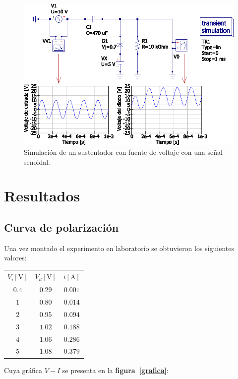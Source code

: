 \documentclass[letter,twoside,11pt]{article}
\begin{document}
\begin{figure}[!h]
\centering
\includegraphics[scale=0.97]{simulacion/practica1.13.eps}
\caption{Simulación de un sustentador con fuente de voltaje con una señal
senoidal.}
\label{simulacion13}
\end{figure}

\newpage
\section{Resultados}

\subsection{Curva de polarización}
Una vez montado el experimento en laboratorio se obtuvieron los siguientes
valores:

\begin{center}
    \begin{tabular}{|c|c|c|}
    \hline
    $V_i[\text{V}]$ & $V_d[\text{V}]$ & $i[\text{A}]$
    \tabularnewline \hline \hline
    $0.4$ & $0.29$ & $0.001$ \tabularnewline \hline
    $1$   & $0.80$ & $0.014$ \tabularnewline \hline
    $2$   & $0.95$ & $0.094$ \tabularnewline \hline
    $3$   & $1.02$ & $0.188$ \tabularnewline \hline
    $4$   & $1.06$ & $0.286$ \tabularnewline \hline
    $5$   & $1.08$ & $0.379$ \tabularnewline \hline
    \end{tabular}
\end{center}

Cuya gráfica $V-I$ se presenta en la \textbf{figura~\ref{grafica}}:
\end{document}
